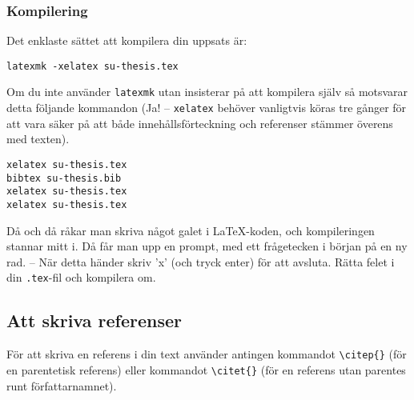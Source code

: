 \subsubsection{Kompilering}

Det enklaste sättet att kompilera din uppsats är:

\begin{verbatim}
latexmk -xelatex su-thesis.tex
\end{verbatim}

\noindent Om du inte använder \texttt{latexmk} utan insisterar på att kompilera
själv så motsvarar detta följande kommandon (Ja! -- \texttt{xelatex} behöver
vanligtvis köras tre gånger för att vara säker på att både innehållsförteckning
och referenser stämmer överens med texten).

\begin{verbatim}
xelatex su-thesis.tex
bibtex su-thesis.bib
xelatex su-thesis.tex
xelatex su-thesis.tex
\end{verbatim}

\noindent Då och då råkar man skriva något galet i \LaTeX-koden, och kompileringen
stannar mitt i. Då får man upp en prompt, med ett frågetecken i början på en ny
rad. -- När detta händer skriv 'x' (och tryck enter) för att avsluta. Rätta
felet i din \texttt{.tex}-fil och kompilera om.


\subsection{Att skriva referenser}

För att skriva en referens i din text använder antingen kommandot
\texttt{\textbackslash{}citep\{\}} (för en parentetisk referens) eller
kommandot \texttt{\textbackslash{}citet\{\}} (för en referens utan parentes
runt författarnamnet).

